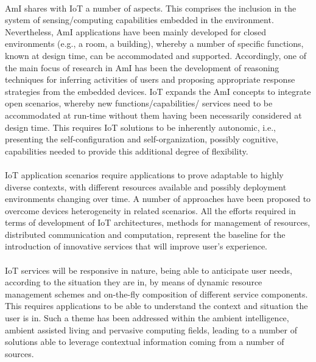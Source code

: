 \documentclass[10pt, twocolumn]{article}
\begin{document}
\paragraph{}
AmI shares with IoT a number of aspects. This comprises the inclusion in the system of sensing/computing capabilities embedded in the environment. Nevertheless, AmI applications have been mainly developed for closed environments (e.g., a room, a building), whereby a number of specific functions, known at design time, can be accommodated and supported. Accordingly, one of
the main focus of research in AmI has been the development of reasoning techniques for inferring activities of users and proposing appropriate response strategies from the embedded devices. IoT expands the AmI concepts to integrate open scenarios, whereby new functions/capabilities/ services need to be accommodated at run-time without them having been necessarily considered at design time. This requires IoT solutions to be inherently autonomic, i.e., presenting the self-configuration and self-organization, possibly cognitive, capabilities needed to provide this additional degree of flexibility.
\paragraph{}
IoT application scenarios require applications to prove adaptable to highly diverse contexts, with different resources available and possibly deployment environments changing over time. A number of approaches have been proposed to overcome devices heterogeneity in related scenarios. All the efforts required in terms of development of IoT architectures, methods for management of resources, distributed communication and computation, represent the baseline for the introduction of innovative services that will improve user's experience.
\paragraph{}
IoT services will be responsive in nature, being able to anticipate user needs, according to the situation they are in, by means of dynamic resource management schemes and on-the-fly composition of different service components. This requires applications to be able to understand the context and situation the user is in. Such a theme has been addressed within the ambient intelligence, ambient assisted living and pervasive computing fields, leading to a number of solutions able to leverage contextual information coming from a number of sources. 
\end{document}
